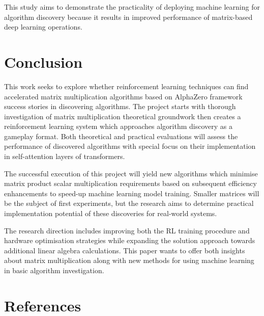\documentclass{article}
\begin{document}
This study aims to demonstrate the practicality of deploying machine learning for algorithm discovery because it results in improved performance of matrix-based deep learning operations.

\section{Conclusion}
This work seeks to explore whether reinforcement learning techniques can find accelerated matrix multiplication algorithms based on AlphaZero framework success stories in discovering algorithms. The project starts with thorough investigation of matrix multiplication theoretical groundwork then creates a reinforcement learning system which approaches algorithm discovery as a gameplay format. Both theoretical and practical evaluations will assess the performance of discovered algorithms with special focus on their implementation in self-attention layers of transformers.

The successful execution of this project will yield new algorithms which minimise matrix product scalar multiplication requirements based on subsequent efficiency enhancements to speed-up machine learning model training. Smaller matrices will be the subject of first experiments, but the research aims to determine practical implementation potential of these discoveries for real-world systems.

The research direction includes improving both the RL training procedure and hardware optimisation strategies while expanding the solution approach towards additional linear algebra calculations. This paper wants to offer both insights about matrix multiplication along with new methods for using machine learning in basic algorithm investigation.

\section{References}
\printbibliography
\end{document}

